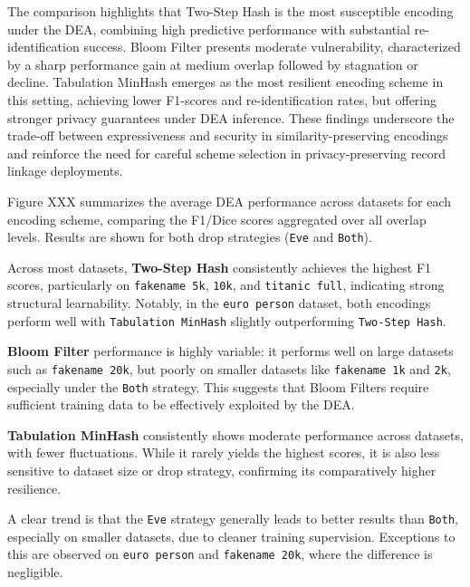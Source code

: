 The comparison highlights that Two-Step Hash is the most susceptible encoding under the DEA, combining high predictive performance with substantial re-identification success. Bloom Filter presents moderate vulnerability, characterized by a sharp performance gain at medium overlap followed by stagnation or decline. Tabulation MinHash emerges as the most resilient encoding scheme in this setting, achieving lower F1-scores and re-identification rates, but offering stronger privacy guarantees under DEA inference. These findings underscore the trade-off between expressiveness and security in similarity-preserving encodings and reinforce the need for careful scheme selection in privacy-preserving record linkage deployments.

Figure XXX summarizes the average DEA performance across datasets for each encoding scheme, comparing the F1/Dice scores aggregated over all overlap levels. Results are shown for both drop strategies (\texttt{Eve} and \texttt{Both}).

Across most datasets, \textbf{Two-Step Hash} consistently achieves the highest F1 scores, particularly on \texttt{fakename 5k}, \texttt{10k}, and \texttt{titanic full}, indicating strong structural learnability. Notably, in the \texttt{euro person} dataset, both encodings perform well with \texttt{Tabulation MinHash} slightly outperforming \texttt{Two-Step Hash}.

\textbf{Bloom Filter} performance is highly variable: it performs well on large datasets such as \texttt{fakename 20k}, but poorly on smaller datasets like \texttt{fakename 1k} and \texttt{2k}, especially under the \texttt{Both} strategy. This suggests that Bloom Filters require sufficient training data to be effectively exploited by the DEA.

\textbf{Tabulation MinHash} consistently shows moderate performance across datasets, with fewer fluctuations. While it rarely yields the highest scores, it is also less sensitive to dataset size or drop strategy, confirming its comparatively higher resilience.

A clear trend is that the \texttt{Eve} strategy generally leads to better results than \texttt{Both}, especially on smaller datasets, due to cleaner training supervision. Exceptions to this are observed on \texttt{euro person} and \texttt{fakename 20k}, where the difference is negligible.









